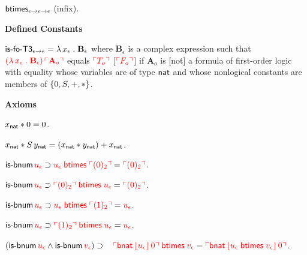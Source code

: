 \documentclass[fleqn,11pt]{article}
\begin{document}
    \item $\mbox{\sf btimes}_{\epsilon \rightarrow \epsilon \rightarrow \epsilon}$ (infix).

  \ee

  \item[] \textbf{Defined Constants}

  \be

    \setcounter{enumi}{3}

    \item $\mbox{\sf is-fo-T3}_{\epsilon \rightarrow \epsilon} = \lambda\,
      x_\epsilon \mathrel. \textbf{B}_\epsilon$ {\sglsp} where
      $\textbf{B}_\epsilon$ is a complex expression such that
      $\textcolor{red}{(\lambda\, x_\epsilon \mathrel. \textbf{B}_\epsilon) \,
      \ulcorner\textbf{A}_o\urcorner}$ equals $\textcolor{red}{\ulcorner T_o\urcorner}$
      [$\textcolor{red}{\ulcorner F_o\urcorner}$] if $\textbf{A}_o$ is [not] a formula of
      first-order logic with equality whose variables are of type
      $\mbox{\sf nat}$ and whose nonlogical constants are members of
      ${\{ 0,S,+,* \}}$.

  \ee

  \item[] \textbf{Axioms}

  \be

    \setcounter{enumi}{17}

    \item $x_{\sf nat} * 0 = 0$.

    \item $x_{\sf nat} * S \, y_{\sf nat} = (x_{\sf nat} * y_{\sf
      nat}) + x_{\sf nat}$.

    \item $\mbox{\sf is-bnum} \, \textcolor{red}{u_\epsilon} \supset
      \textcolor{red}{u_\epsilon \; \mbox{\sf btimes} \; \ulcorner(0)_2\urcorner} =
      \textcolor{red}{\ulcorner(0)_2\urcorner}$.

    \item $\mbox{\sf is-bnum} \, \textcolor{red}{u_\epsilon} \supset \textcolor{red}{
      \ulcorner(0)_2\urcorner \; \mbox{\sf btimes} \; u_\epsilon} =
      \textcolor{red}{\ulcorner(0)_2\urcorner}$.

    \item $\mbox{\sf is-bnum} \, \textcolor{red}{u_\epsilon} \supset
      \textcolor{red}{u_\epsilon \; \mbox{\sf btimes} \; \ulcorner(1)_2\urcorner} =
      \textcolor{red}{u_\epsilon}$.

    \item $\mbox{\sf is-bnum} \, \textcolor{red}{u_\epsilon} \supset
      \textcolor{red}{\ulcorner(1)_2\urcorner \; \mbox{\sf btimes} \; u_\epsilon} =
      \textcolor{red}{u_\epsilon}$.

    \item $(\mbox{\sf is-bnum} \, \textcolor{red}{u_\epsilon} \wedge \mbox{\sf is-bnum}
      \, \textcolor{red}{v_\epsilon}) \supset {}\\
        \hspace*{2ex} \textcolor{red}{\ulcorner\mbox{\sf bnat} \,
            \lfloor u_\epsilon\rfloor \, 0\urcorner \; \mbox{\sf btimes} \;
          \textcolor{red}{v_\epsilon}} = \textcolor{red}{\ulcorner\mbox{\sf bnat} \,
            \lfloor u_\epsilon \; \mbox{\sf btimes} \; v_\epsilon\rfloor \,
            0\urcorner}$.
\end{document}
